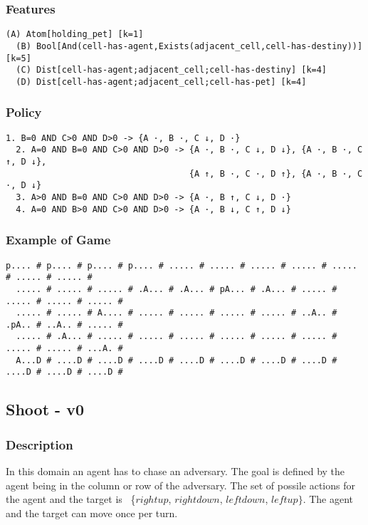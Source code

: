\documentclass[a4paper]{article}
\begin{document}
\subsubsection{Features}
\begin{Verbatim}[fontsize=\footnotesize]
  (A) Atom[holding_pet] [k=1]
  (B) Bool[And(cell-has-agent,Exists(adjacent_cell,cell-has-destiny))] [k=5]
  (C) Dist[cell-has-agent;adjacent_cell;cell-has-destiny] [k=4]
  (D) Dist[cell-has-agent;adjacent_cell;cell-has-pet] [k=4]
\end{Verbatim}

\subsubsection{Policy}
\begin{Verbatim}[fontsize=\footnotesize]
  1. B=0 AND C>0 AND D>0 -> {A ·, B ·, C ↓, D ·}
  2. A=0 AND B=0 AND C>0 AND D>0 -> {A ·, B ·, C ↓, D ↓}, {A ·, B ·, C ↑, D ↓},
                                    {A ↑, B ·, C ·, D ↑}, {A ·, B ·, C ·, D ↓}
  3. A>0 AND B=0 AND C>0 AND D>0 -> {A ·, B ↑, C ↓, D ·}
  4. A=0 AND B>0 AND C>0 AND D>0 -> {A ·, B ↓, C ↑, D ↓}

\end{Verbatim}

\subsubsection{Example of Game}
\begin{Verbatim}[fontsize=\footnotesize]
  p.... # p.... # p.... # p.... # ..... # ..... # ..... # ..... # ..... # ..... # ..... #
  ..... # ..... # ..... # .A... # .A... # pA... # .A... # ..... # ..... # ..... # ..... #
  ..... # ..... # A.... # ..... # ..... # ..... # ..... # ..A.. # .pA.. # ..A.. # ..... #
  ..... # .A... # ..... # ..... # ..... # ..... # ..... # ..... # ..... # ..... # ...A. #
  A...D # ....D # ....D # ....D # ....D # ....D # ....D # ....D # ....D # ....D # ....D #
\end{Verbatim}

\subsection{Shoot - v0}
\subsubsection{Description}
In this domain an agent has to chase an adversary. The goal is defined by the agent being in the column or row of the adversary. The set of possile actions for the agent and the target is ~\{$rightup$, $rightdown$, $leftdown$, $leftup\}$.  The agent and the target can move once per turn.
\end{document}
